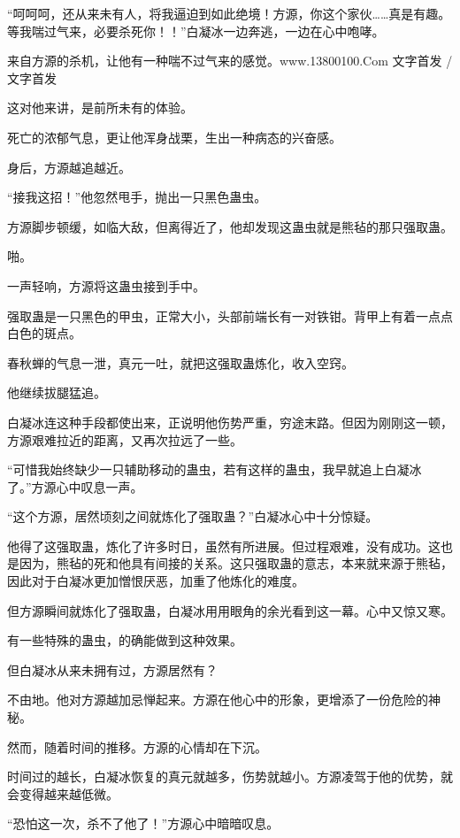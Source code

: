 
\begin{this_body}

“呵呵呵，还从来未有人，将我逼迫到如此绝境！方源，你这个家伙……真是有趣。等我喘过气来，必要杀死你！！”白凝冰一边奔逃，一边在心中咆哮。

来自方源的杀机，让他有一种喘不过气来的感觉。www.13800100.Com 文字首发 /文字首发

这对他来讲，是前所未有的体验。

死亡的浓郁气息，更让他浑身战栗，生出一种病态的兴奋感。

身后，方源越追越近。

“接我这招！”他忽然甩手，抛出一只黑色蛊虫。

方源脚步顿缓，如临大敌，但离得近了，他却发现这蛊虫就是熊毡的那只强取蛊。

啪。

一声轻响，方源将这蛊虫接到手中。

强取蛊是一只黑色的甲虫，正常大小，头部前端长有一对铁钳。背甲上有着一点点白色的斑点。

春秋蝉的气息一泄，真元一吐，就把这强取蛊炼化，收入空窍。

他继续拔腿猛追。

白凝冰连这种手段都使出来，正说明他伤势严重，穷途末路。但因为刚刚这一顿，方源艰难拉近的距离，又再次拉远了一些。

“可惜我始终缺少一只辅助移动的蛊虫，若有这样的蛊虫，我早就追上白凝冰了。”方源心中叹息一声。

“这个方源，居然顷刻之间就炼化了强取蛊？”白凝冰心中十分惊疑。

他得了这强取蛊，炼化了许多时日，虽然有所进展。但过程艰难，没有成功。这也是因为，熊毡的死和他具有间接的关系。这只强取蛊的意志，本来就来源于熊毡，因此对于白凝冰更加憎恨厌恶，加重了他炼化的难度。

但方源瞬间就炼化了强取蛊，白凝冰用用眼角的余光看到这一幕。心中又惊又寒。

有一些特殊的蛊虫，的确能做到这种效果。

但白凝冰从来未拥有过，方源居然有？

不由地。他对方源越加忌惮起来。方源在他心中的形象，更增添了一份危险的神秘。

然而，随着时间的推移。方源的心情却在下沉。

时间过的越长，白凝冰恢复的真元就越多，伤势就越小。方源凌驾于他的优势，就会变得越来越低微。

“恐怕这一次，杀不了他了！”方源心中暗暗叹息。


\end{this_body}
